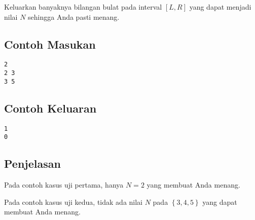 \documentclass{article}
\begin{document}
Keluarkan banyaknya bilangan bulat pada interval $[L, R]$ yang dapat menjadi nilai $N$ sehingga Anda pasti menang.

\begin{multicols}{2}
\subsection*{Contoh Masukan}
\begin{lstlisting}
2
2 3
3 5
\end{lstlisting}
\columnbreak
\subsection*{Contoh Keluaran}
\begin{lstlisting}
1
0
\end{lstlisting}
\vfill
\null
\end{multicols}

\subsection*{Penjelasan}
Pada contoh kasus uji pertama, hanya $N = 2$ yang membuat Anda menang.

Pada contoh kasus uji kedua, tidak ada nilai $N$ pada $\left\{3,4,5\right\}$ yang dapat membuat Anda menang.
\pagebreak
\end{document}
